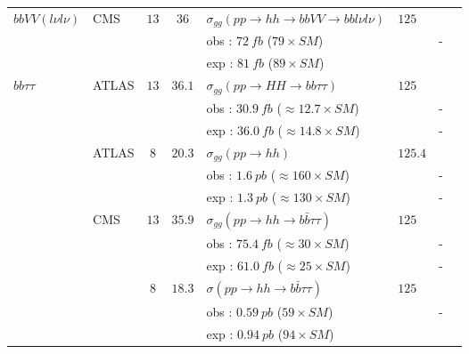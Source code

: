 \begin{table}[h!]
\begin{center}
\begin{tabular}{|l|l|c|c|l|l|c|c|}
\hline
$bb VV (l\nu l\nu)$            &CMS            &$13$        &$36$        &$\sigma_{gg}(pp\rightarrow hh\rightarrow bbVV\rightarrow bbl\nu l\nu)$  &$125$     &    &\cite{Sirunyan:2017guj}\\
                    &            &        &        &obs : $72\ fb$ ($79\times SM$)                &    &-    &\\
                    &            &        &        &exp : $81\ fb$ ($89\times SM$)                &    &    &\\
\hline
$bb \tau\tau$                &ATLAS            &$13$        &$36.1$        &$\sigma_{gg}(pp\rightarrow HH\rightarrow bb\tau\tau)$  &$125$     &    &\cite{Aaboud:2018sfw}\\
                    &            &        &        &obs : $30.9\ fb$ ($\approx 12.7\times SM$)    &    &-    &\\
                    &            &        &        &exp : $36.0\ fb$ ($\approx 14.8\times SM$)    &    &-    &\\
\cline{2-8}
                    &ATLAS            &$8$        &$20.3$        &$\sigma_{gg}(pp\rightarrow hh)$  &$125.4$     &    &\cite{Aad:2015xja}\\
                    &            &        &        &obs : $1.6\ pb$ ($\approx 160\times SM$)    &    &-    &\\
                    &            &        &        &exp : $1.3\ pb$ ($\approx 130\times SM$)    &    &-    &\\
\cline{2-8}
                    &CMS            &$13$        &$35.9$        &$\sigma_{gg}(pp\rightarrow hh\rightarrow b\bar{b}\tau\tau)$  &$125$    &    &\cite{Sirunyan:2017djm}\\
                    &            &        &        &obs : $75.4\ fb$ ($\approx 30\times SM$)                &    &- &\\
                    &            &        &        &exp : $61.0\ fb$ ($\approx 25\times SM$)                &    &- &\\
\cline{3-8}
                    &            &$8$        &$18.3$        &$\sigma(pp\rightarrow hh\rightarrow b\bar{b}\tau\tau)$  &$125$    &    &\cite{Sirunyan:2017tqo}\\
                    &            &        &        &obs : $0.59\ pb$ ($59\times SM$)                            &    &-    &\\
                    &            &        &        &exp : $0.94\ pb$ ($94\times SM$)                            &    &    &\\
\hline




\end{tabular}
\end{center}
\end{table}
